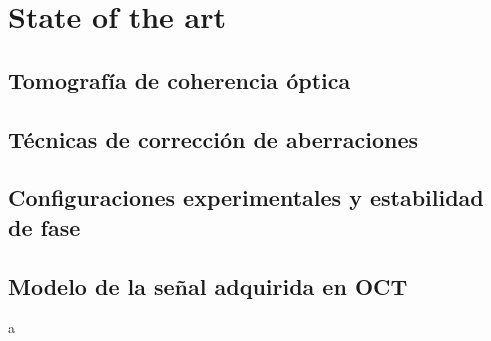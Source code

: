 \newpage
{}
\chapter{State of the art}

\section{Tomografía de coherencia óptica}

\section{Técnicas de corrección de aberraciones}

\section{Configuraciones experimentales y estabilidad de fase}

\section{Modelo de la señal adquirida en OCT}

a